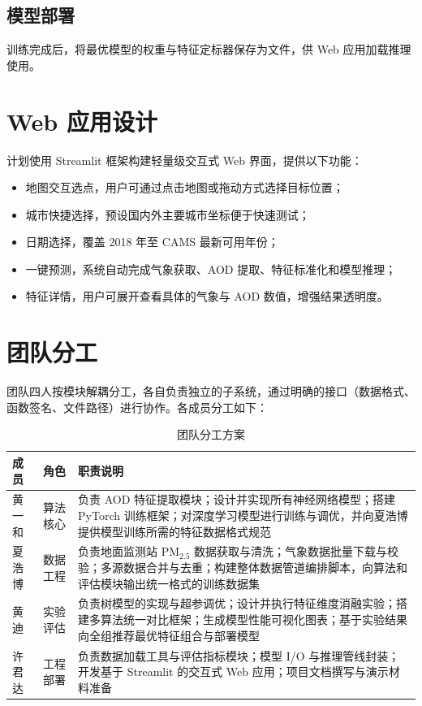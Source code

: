 \documentclass[UTF8,zihao=-4,a4paper]{ctexart}
\newcommand{\pmfine}{PM$_{2.5}$}
\newcommand{\aodd}{AOD}
\begin{document}
\subsection{模型部署}

训练完成后，将最优模型的权重与特征定标器保存为文件，供 Web 应用加载推理使用。

\section{Web 应用设计}

计划使用 Streamlit 框架构建轻量级交互式 Web 界面，提供以下功能：

\begin{itemize}
  \item 地图交互选点，用户可通过点击地图或拖动方式选择目标位置；
  \item 城市快捷选择，预设国内外主要城市坐标便于快速测试；
  \item 日期选择，覆盖 2018 年至 CAMS 最新可用年份；
  \item 一键预测，系统自动完成气象获取、\aodd{} 提取、特征标准化和模型推理；
  \item 特征详情，用户可展开查看具体的气象与 \aodd{} 数值，增强结果透明度。
\end{itemize}

\section{团队分工}

团队四人按模块解耦分工，各自负责独立的子系统，通过明确的接口（数据格式、函数签名、文件路径）进行协作。各成员分工如下：

\begin{table}[H]
  \centering
  \caption{团队分工方案}
  \begin{tabularx}{\textwidth}{llX}
    \toprule
    成员 & 角色 & 职责说明 \\
    \midrule
    黄一和 & 算法核心 & 负责 \aodd{} 特征提取模块；设计并实现所有神经网络模型；搭建 PyTorch 训练框架；对深度学习模型进行训练与调优，并向夏浩博提供模型训练所需的特征数据格式规范 \\
    夏浩博 & 数据工程 & 负责地面监测站 \pmfine{} 数据获取与清洗；气象数据批量下载与校验；多源数据合并与去重；构建整体数据管道编排脚本，向算法和评估模块输出统一格式的训练数据集 \\
    黄迪 & 实验评估 & 负责树模型的实现与超参调优；设计并执行特征维度消融实验；搭建多算法统一对比框架；生成模型性能可视化图表；基于实验结果向全组推荐最优特征组合与部署模型 \\
    许君达 & 工程部署 & 负责数据加载工具与评估指标模块；模型 I/O 与推理管线封装；开发基于 Streamlit 的交互式 Web 应用；项目文档撰写与演示材料准备 \\
    \bottomrule
  \end{tabularx}
\end{table}
\end{document}
